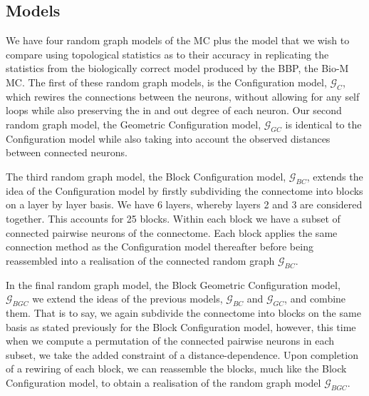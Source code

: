 \subsection{Models}
We have four random graph models of the MC plus the \ER model that we wish to compare using topological statistics as to their accuracy in replicating the statistics from the biologically correct model produced by the BBP, the Bio-M MC. The first of these random graph models, is the Configuration model, $\mathcal{G}_{C}$, which rewires the connections between the neurons, without allowing for any self loops while also preserving the in and out degree of each neuron.
Our second random graph model, the Geometric Configuration model, $\mathcal{G}_{GC}$ is identical to the Configuration model while also taking into account the observed distances between connected neurons. 

The third random graph model, the Block Configuration model, $\mathcal{G}_{BC}$, extends the idea of the Configuration model by firstly subdividing the connectome into blocks on a layer by layer basis. We have 6 layers, whereby layers 2 and 3 are considered together. This accounts for 25 blocks. Within each block we have a subset of connected pairwise neurons of the connectome. Each block applies the same connection method as the Configuration model thereafter before being reassembled into a realisation of the connected random graph $\mathcal{G}_{BC}$.


In the final random graph model, the Block Geometric Configuration model, $\mathcal{G}_{BGC}$ we extend the ideas of the previous models,  $\mathcal{G}_{BC}$ and $\mathcal{G}_{GC}$, and combine them. That is to say, we again subdivide the connectome into blocks on the same basis as stated previously for the Block Configuration model, however, this time when we compute a permutation of the connected pairwise neurons in each subset, we take the added constraint of a distance-dependence. Upon completion of a rewiring of each block, we can reassemble the blocks, much like the Block Configuration model, to obtain a realisation of the random graph model $\mathcal{G}_{BGC}$. 




